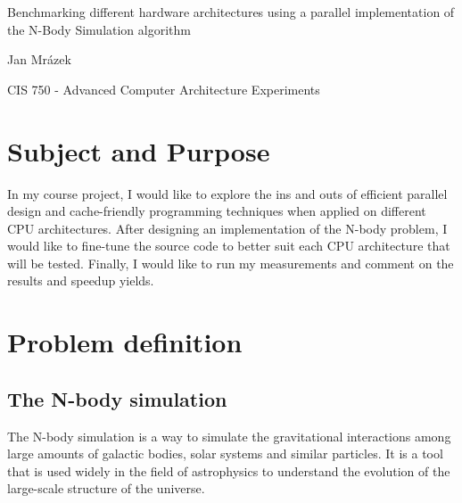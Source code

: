 \documentclass[12pt]{article}
\author{Jan Mrázek}
\begin{document}
	
\begin{titlepage}
	
	\begin{center}
	\vspace{\fill}
	\LARGE Benchmarking different hardware architectures using a parallel implementation of the N-Body Simulation algorithm
	\vspace{\fill}	
	
	\Large Jan Mrázek
	\vspace{\fill}
	
	\Large CIS 750 - Advanced Computer Architecture Experiments
	\vspace{\fill}
	\end{center}

\end{titlepage}

\section{Subject and Purpose}

In my course project, I would like to explore the ins and outs of efficient parallel design and cache-friendly programming techniques when applied on different CPU architectures. After designing an implementation of the N-body problem, I would like to fine-tune the source code to better suit each CPU architecture that will be tested. Finally, I would like to run my measurements and comment on the results and speedup yields.

\section{Problem definition}

\subsection*{The N-body simulation}

The N-body simulation is a way to simulate the gravitational interactions among large amounts of galactic bodies, solar systems and similar particles. It is a tool that is used widely in the field of astrophysics to understand the evolution of the large-scale structure of the universe.\cite{scholarpedia}
\end{document}
